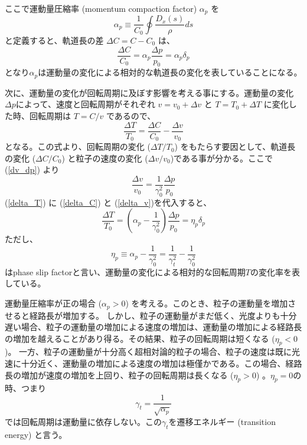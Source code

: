 \documentclass[10pt,a4paper]{ltjsarticle}
\begin{document}
%
ここで運動量圧縮率 (momentum compaction factor) $\alpha_p$ を
%
\begin{equation}
    \alpha_p \equiv \frac{1}{C_0} \oint \frac{D_x(s)}{\rho} ds
\end{equation}
%
と定義すると、軌道長の差 $\Delta C = C-C_0$ は、
%
\begin{equation}
    \frac{\Delta C}{C_0}=\alpha_p\frac{\Delta p}{p_0}=\alpha_p\delta_p
    \label{delta_C}
\end{equation}
%
となり$\alpha_p$は運動量の変化による相対的な軌道長の変化を表していることになる。

次に、運動量の変化が回転周期に及ぼす影響を考える事にする。運動量の変化$\Delta p$によって、速度と回転周期がそれぞれ $v=v_0+\Delta v$ と $T=T_0+\Delta T$ に変化した時、回転周期は $T=C/v$ であるので、
%
\begin{equation}
    \frac{\Delta T}{T_0} = \frac{\Delta C}{C_0} - \frac{\Delta v}{v_0}
    \label{delta_T}
\end{equation}
%
となる。この式より、回転周期の変化 ($\Delta T/T_0$) をもたらす要因として、軌道長の変化 ($\Delta C/C_0$) と粒子の速度の変化 ($\Delta v/v_0$)である事が分かる。ここで(\ref{dv_dp}) より
%
\begin{equation}
    \frac{\Delta v}{v_0}=\frac{1}{\gamma_0^2}\frac{\Delta p}{p_0}
    \label{delta_v}
\end{equation}
%
(\ref{delta_T}) に (\ref{delta_C}) と (\ref{delta_v})を代入すると、
%
\begin{equation}
    \frac{\Delta T}{T_0} = \left(\alpha_p - \frac{1}{\gamma_0^2}\right)\frac{\Delta p}{p_0} = \eta_p \delta_p
\end{equation}
%
ただし、
%
\begin{equation}
    \eta_p \equiv \alpha_p - \frac{1}{\gamma_0^2} = \frac{1}{\gamma_t^2} - \frac{1}{\gamma_0^2}
    \label{alppha_slip}
\end{equation}
%
はphase slip factorと言い、運動量の変化による相対的な回転周期$T$の変化率を表している。
%

運動量圧縮率が正の場合 ($\alpha_p>0$) を考える。このとき、粒子の運動量を増加させると経路長が増加する。 しかし、粒子の運動量がまだ低く、光度よりも十分遅い場合、粒子の運動量の増加による速度の増加は、運動量の増加による経路長の増加を越えることがあり得る。その結果、粒子の回転周期は短くなる ($\eta_p < 0$)。
一方、粒子の運動量が十分高く超相対論的粒子の場合、粒子の速度は既に光速に十分近く、運動量の増加による速度の増加は極僅かである。この場合、経路長の増加が速度の増加を上回り、粒子の回転周期は長くなる ($\eta_p>0$) 。$\eta_p = 0$の時、つまり
%
\begin{equation}
    \gamma_t = \frac{1}{\sqrt{\alpha_p}}
\end{equation}
%
では回転周期は運動量に依存しない。この$\gamma_t$を遷移エネルギー (transition energy) と言う。
\end{document}
